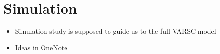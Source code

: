 \section{Simulation}
\begin{itemize}
	\item Simulation study is supposed to guide us to the full VARSC-model
	\item Ideas in OneNote
\end{itemize}